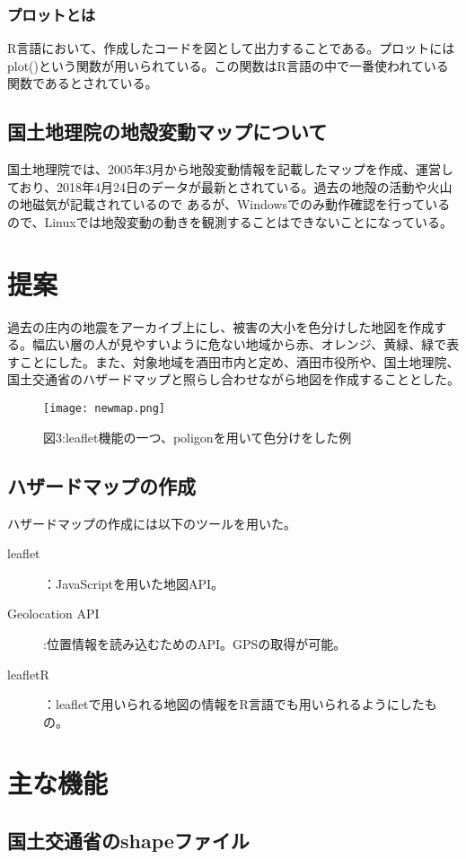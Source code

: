 \documentclass[report]{jsbook}
\begin{document}
  \subsection{プロットとは}
  R言語において、作成したコードを図として出力することである。プロットにはplot()という関数が用いられている。この関数はR言語の中で一番使われている関数であるとされている。
  
  \section{国土地理院の地殻変動マップについて}
国土地理院では、2005年3月から地殻変動情報を記載したマップを作成、運営しており、2018年4月24日のデータが最新とされている。過去の地殻の活動や火山の地磁気が記載されているので
あるが、Windowsでのみ動作確認を行っているので、Linuxでは地殻変動の動きを観測することはできないことになっている。
\chapter{提案}
過去の庄内の地震をアーカイブ上にし、被害の大小を色分けした地図を作成する。幅広い層の人が見やすいように危ない地域から赤、オレンジ、黄緑、緑で表すことにした。また、対象地域を酒田市内と定め、酒田市役所や、国土地理院、国土交通省のハザードマップと照らし合わせながら地図を作成することとした。
\begin{center}
   \begin{figure}[htp]
    \texttt{[image: newmap.png]}
    \caption{図3:leaflet機能の一つ、poligonを用いて色分けをした例}
   \end{figure}
\end{center}
\section{ハザードマップの作成}
ハザードマップの作成には以下のツールを用いた。
\begin{description}
\item[leaflet]：JavaScriptを用いた地図API。
  \item[Geolocation API]:位置情報を読み込むためのAPI。GPSの取得が可能。
 \item[leafletR]：leafletで用いられる地図の情報をR言語でも用いられるようにしたもの。
\end{description}

\chapter{主な機能}
\section{国土交通省のshapeファイル}
\end{document}
